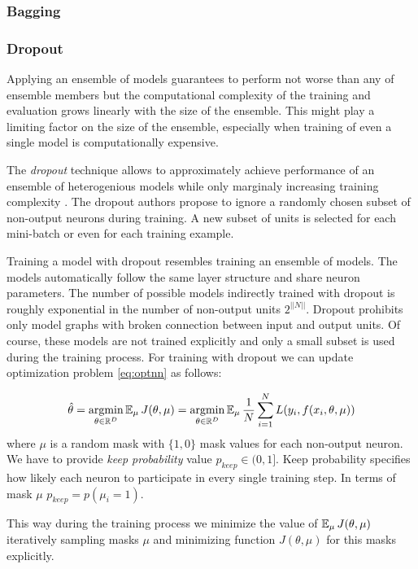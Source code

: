 \subsubsection{Bagging}
\subsubsection{Dropout}

Applying an ensemble of models guarantees to perform not worse than any of ensemble members but the computational complexity of the training and evaluation grows linearly with the size of the ensemble. This might play a limiting factor on the size of the ensemble, especially when training of even a single model is computationally expensive.

The \textit{dropout} technique allows to approximately achieve performance of an ensemble of heterogenious models while only marginaly increasing training complexity \cite{Srivastava2014}.
The dropout authors propose to ignore a randomly chosen subset of non-output neurons during training. A new subset of units is selected for each mini-batch or even for each training example.

Training a model with dropout resembles training an ensemble of models. The models automatically follow the same layer structure and share neuron parameters. The number of possible models indirectly trained with dropout is roughly exponential in the number of non-output units $2^{||N||}$. Dropout prohibits only model graphs with broken connection between input and output units. Of course, these models are not trained explicitly and only a small subset is used during the training process. For training with dropout we can update optimization problem \ref{eq:optnn} as follows:

\begin{equation}\label{eq:optnndo}
  \hat{\theta} = \operatorname*{argmin}_{\theta \in \Bbb{R}^D} \operatorname{\mathbb{E}}_\mu J(\theta, \mu) = \operatorname*{argmin}_{\theta \in \Bbb{R}^D} \operatorname{\mathbb{E}}_\mu \frac{1}{N} \sum_{i=1}^{N} L(y_i, f(x_i, \theta, \mu))
\end{equation}
where $\mu$ is a random mask with $\{1, 0\}$ mask values for each non-output neuron. We have to provide \textit{keep probability} value $p_{keep} \in (0, 1]$. Keep probability specifies how likely each neuron to participate in every single training step. In terms of mask $\mu$ $p_{keep}=p(\mu_i = 1)$.

This way during the training process we minimize the value of $\operatorname{\mathbb{E}}_\mu J(\theta, \mu)$ iteratively sampling masks $\mu$ and minimizing function $J(\theta, \mu)$ for this masks explicitly.

